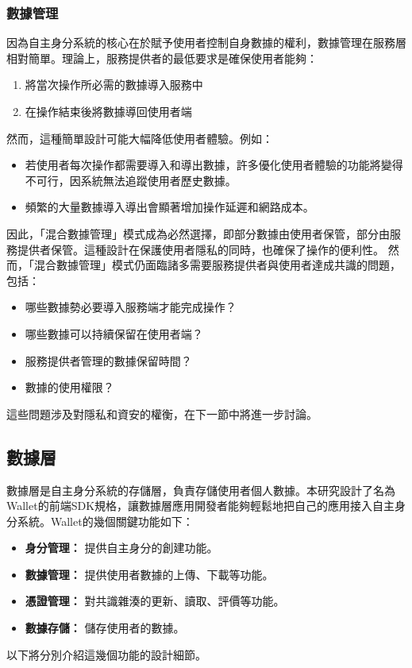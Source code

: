 \subsubsection{數據管理}
因為自主身分系統的核心在於賦予使用者控制自身數據的權利，數據管理在服務層相對簡單。理論上，服務提供者的最低要求是確保使用者能夠：
\begin{enumerate}
  \item 將當次操作所必需的數據導入服務中
  \item 在操作結束後將數據導回使用者端
\end{enumerate}
然而，這種簡單設計可能大幅降低使用者體驗。例如：
\begin{itemize}
  \item 若使用者每次操作都需要導入和導出數據，許多優化使用者體驗的功能將變得不可行，因系統無法追蹤使用者歷史數據。
  \item 頻繁的大量數據導入導出會顯著增加操作延遲和網路成本。
\end{itemize}
因此，「混合數據管理」模式成為必然選擇，即部分數據由使用者保管，部分由服務提供者保管。這種設計在保護使用者隱私的同時，也確保了操作的便利性。
然而，「混合數據管理」模式仍面臨諸多需要服務提供者與使用者達成共識的問題，包括：
\begin{itemize}
  \item 哪些數據勢必要導入服務端才能完成操作？
  \item 哪些數據可以持續保留在使用者端？
  \item 服務提供者管理的數據保留時間？
  \item 數據的使用權限？
\end{itemize}
這些問題涉及對隱私和資安的權衡，在下一節中將進一步討論。
\subsection{數據層}
數據層是自主身分系統的存儲層，負責存儲使用者個人數據。本研究設計了名為Wallet的前端SDK規格，讓數據層應用開發者能夠輕鬆地把自己的應用接入自主身分系統。Wallet的幾個關鍵功能如下：
\begin{itemize}
  \item \textbf{身分管理：} 提供自主身分的創建功能。
  \item \textbf{數據管理：} 提供使用者數據的上傳、下載等功能。
  \item \textbf{憑證管理：} 對共識雜湊的更新、讀取、評價等功能。
  \item \textbf{數據存儲：} 儲存使用者的數據。
\end{itemize}
以下將分別介紹這幾個功能的設計細節。

